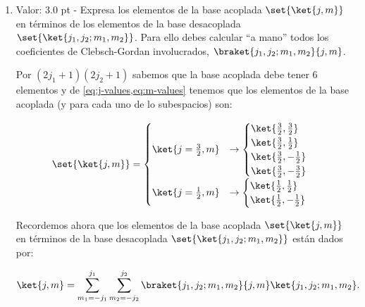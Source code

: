 \documentclass[./../main.tex]{subfiles}
\begin{document}
\begin{exercise}
\begin{enumerate}[label=(\alph*)]
            \pagebreak
            \item Valor: 3.0 pt - Expresa los elementos de la base acoplada \(\set{\ket{j,m}}\) en términos de los elementos de la base desacoplada \(\set{\ket{j_{1}, j_{2}; m_{1}, m_{2}}}\). Para ello debes calcular ``a mano'' todos los coeficientes de Clebsch-Gordan involucrados, \(\braket{j_{1},j_{2}; m_{1}, m_{2}}{j,m}\).
            
            \begin{solution}
                Por \((2j_{1} + 1)(2j_{2} + 1)\) sabemos que la base acoplada debe tener 6 elementos y de \cref{eq:j-values,eq:m-values} tenemos que los elementos de la base acoplada (y para cada uno de lo subespacios) son:

                \begin{equation*}
                    \set{\ket{j,m}} = 
                    \begin{cases}
                        \ket{j = \frac{3}{2}, m} &\rightarrow \begin{cases}
                            \ket{\frac{3}{2}, \frac{3}{2}}\\
                            \ket{\frac{3}{2}, \frac{1}{2}}\\
                            \ket{\frac{3}{2}, -\frac{1}{2}}\\
                            \ket{\frac{3}{2}, -\frac{3}{2}}
                        \end{cases}\\
                        \ket{j = \frac{1}{2}, m} &\rightarrow \begin{cases}
                            \ket{\frac{1}{2}, \frac{1}{2}}\\
                            \ket{\frac{1}{2}, -\frac{1}{2}}
                        \end{cases}
                    \end{cases}
                \end{equation*}

                Recordemos ahora que los elementos de la base acoplada \(\set{\ket{j,m}}\) en términos de la base desacoplada \(\set{\ket{j_{1}, j_{2}; m_{1}, m_{2}}}\) están dados por:

                \begin{equation}
                    \ket{j, m} = \sum_{m_{1} = -j_{1}}^{j_{1}}\sum_{m_{2} = -j_{2}}^{j_{2}}\braket{j_{1}, j_{2}; m_{1}, m_{2}}{j, m}\ket{j_{1}, j_{2}; m_{1}, m_{2}}.
                    \label{eq:coupled-base-elements}
                \end{equation}


\end{solution}
\end{enumerate}
\end{exercise}
\end{document}
